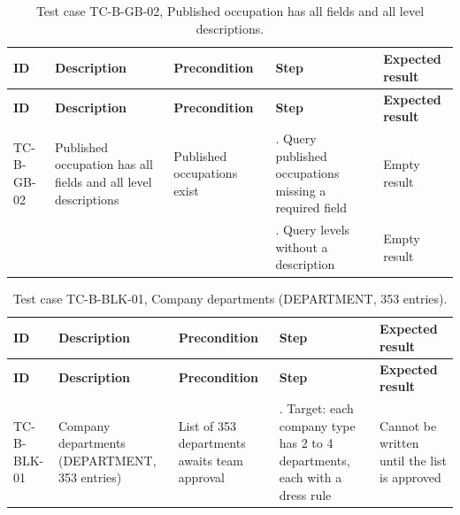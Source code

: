 {\small
\begin{longtable}{|>{\raggedright\arraybackslash}p{}|>{\raggedright\arraybackslash}p{}|>{\raggedright\arraybackslash}p{}|>{\raggedright\arraybackslash}p{}|>{\raggedright\arraybackslash}p{}|}
\caption{Test case TC-B-GB-02, Published occupation has all fields and all level descriptions.} \\
\hline
\textbf{ID} & \textbf{Description} & \textbf{Precondition} & \textbf{Step} & \textbf{Expected result} \\ \hline
\endfirsthead
\hline
\textbf{ID} & \textbf{Description} & \textbf{Precondition} & \textbf{Step} & \textbf{Expected result} \\ \hline
\endhead
TC-B-GB-02 & Published occupation has all fields and all level descriptions & Published occupations exist & 1. Query published occupations missing a required field & Empty result \\ \hline
 &  &  & 2. Query levels without a description & Empty result \\ \hline
\end{longtable}
}

{\small
\begin{longtable}{|>{\raggedright\arraybackslash}p{}|>{\raggedright\arraybackslash}p{}|>{\raggedright\arraybackslash}p{}|>{\raggedright\arraybackslash}p{}|>{\raggedright\arraybackslash}p{}|}
\caption{Test case TC-B-BLK-01, Company departments (DEPARTMENT, 353 entries).} \\
\hline
\textbf{ID} & \textbf{Description} & \textbf{Precondition} & \textbf{Step} & \textbf{Expected result} \\ \hline
\endfirsthead
\hline
\textbf{ID} & \textbf{Description} & \textbf{Precondition} & \textbf{Step} & \textbf{Expected result} \\ \hline
\endhead
TC-B-BLK-01 & Company departments (DEPARTMENT, 353 entries) & List of 353 departments awaits team approval & 1. Target: each company type has 2 to 4 departments, each with a dress rule & Cannot be written until the list is approved \\ \hline
\end{longtable}
}

